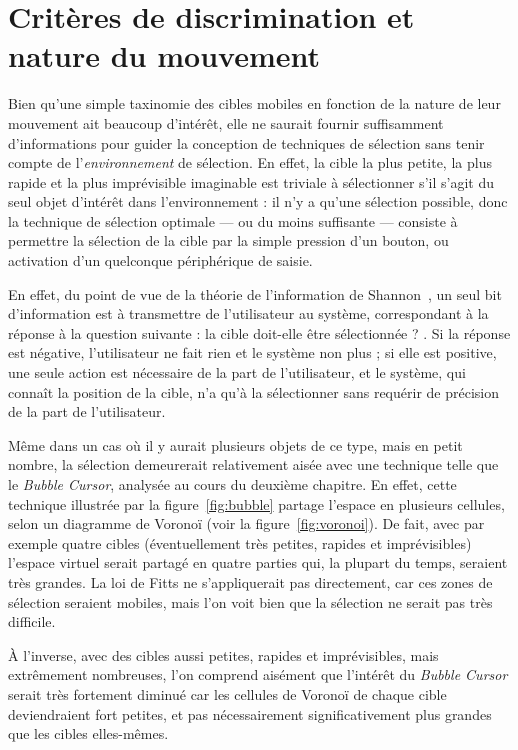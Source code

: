 	\section{Critères de discrimination et nature du mouvement}
	Bien qu'une \og simple \fg{} taxinomie des cibles mobiles en fonction de la nature de leur mouvement ait beaucoup d'intérêt, elle ne saurait fournir suffisamment d'informations pour guider la conception de techniques de sélection sans tenir compte de l'\emph{environnement} de sélection. En effet, la cible la plus petite, la plus rapide et la plus imprévisible imaginable est triviale à sélectionner s'il s'agit du seul objet d'intérêt dans l'environnement : il n'y a qu'une sélection possible, donc la technique de sélection optimale --- ou du moins suffisante --- consiste à permettre la sélection de la cible par la simple pression d'un bouton, ou activation d'un quelconque périphérique de saisie.
	
	En effet, du point de vue de la théorie de l'information de Shannon~\cite{shannon2001mathematical}, un seul bit d'information est à transmettre de l'utilisateur au système, correspondant à la réponse à la question suivante : \og la cible doit-elle être sélectionnée ? \fg{}. Si la réponse est négative, l'utilisateur ne fait rien et le système non plus ; si elle est positive, une seule action est nécessaire de la part de l'utilisateur, et le système, qui connaît la position de la cible, n'a qu'à la sélectionner sans requérir de précision de la part de l'utilisateur.
	
	Même dans un cas où il y aurait plusieurs objets de ce type, mais en petit nombre, la sélection demeurerait relativement aisée avec une technique telle que le \emph{Bubble Cursor}, analysée au cours du deuxième chapitre. En effet, cette technique illustrée par la figure~\ref{fig:bubble} partage l'espace en plusieurs cellules, selon un diagramme de Voronoï (voir la figure~\ref{fig:voronoi}). De fait, avec par exemple quatre cibles (éventuellement très petites, rapides et imprévisibles) l'espace virtuel serait partagé en quatre parties qui, la plupart du temps, seraient très grandes. La loi de Fitts ne s'appliquerait pas directement, car ces zones de sélection seraient mobiles, mais l'on voit bien que la sélection ne serait pas très difficile.
	
	À l'inverse, avec des cibles aussi petites, rapides et imprévisibles, mais extrêmement nombreuses, l'on comprend aisément que l'intérêt du \emph{Bubble Cursor} serait très fortement diminué car les cellules de Voronoï de chaque cible deviendraient fort petites, et pas nécessairement significativement plus grandes que les cibles elles-mêmes.
	

